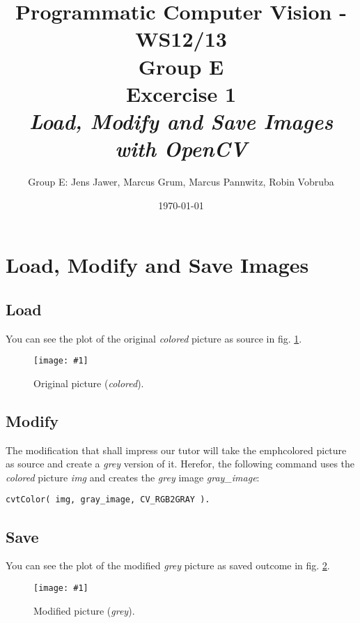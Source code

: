 \documentclass[a4paper,headings=small]{scrartcl}
\title{Programmatic Computer Vision - WS12/13 \\ Group E \\ Excercise 1 \\ \emph{Load, Modify and Save Images with OpenCV}}
\author{Group E: Jens Jawer, Marcus Grum, Marcus Pannwitz, Robin Vobruba}
\date{\today}
\numberwithin{equation}{section} %
\numberwithin{figure}{section}   %
\newcommand{\image}[3]{
	\begin{figure}[htbp]
		\centering
		\texttt{[image: \#1]}
		\caption{#3}
		\label{fig:#1}
	\end{figure}
}
\begin{document}
\maketitle



\section{Load, Modify and Save Images}


\subsection{Load}

You can see the plot of the original \emph{colored} picture as source
in fig. \ref{fig:../../../target/input}.

\image{../../../target/input}{0.5}{%
		Original picture (\emph{colored}).}



\subsection{Modify}

The modification that shall impress our tutor will take the emph{colored} picture as source 
and create a \emph{grey} version of it. Herefor, the following command uses the \emph{colored} 
picture \emph{img} and creates the \emph{grey} image \emph{gray\_image}:
\begin{lstlisting}
cvtColor( img, gray_image, CV_RGB2GRAY ).
\end{lstlisting}

\newpage

\subsection{Save}

You can see the plot of the modified \emph{grey} picture as saved outcome
in fig. \ref{fig:../../../target/result}.

\image{../../../target/result}{0.5}{%
		Modified picture (\emph{grey}).}
\end{document}

